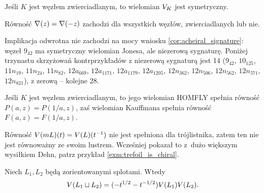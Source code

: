 \begin{corollary}
%
\label{cor:jones_of_amphicheiral}%
    Jeśli $K$ jest węzłem zwierciadlanym, to wielomian $V_K$ jest symetryczny.
\end{corollary}

Równość $\nabla(z) = \nabla(-z)$ zachodzi dla wszystkich węzłów, zwierciadlanych lub nie.

Implikacja odwrotna nie zachodzi na mocy wniosku \ref{cor:acheiral_signature}: węzeł $9_{42}$ ma symetryczny wielomian Jonesa, ale niezerową sygnaturę.
%
Poniżej trzynastu skrzyżowań kontrprzykładów z niezerową sygnaturą jest 14 ($9_{42}$, $10_{125}$, $11n_{19}$, $11n_{24}$, $11n_{82}$, $12a_{669}$, $12a_{1171}$, $12a_{1179}$, $12a_{1205}$, $12n_{362}$, $12n_{506}$, $12n_{562}$, $12n_{571}$, $12n_{821}$), z zerową -- kolejne 28.

\begin{corollary}
%
    Jeśli $K$ jest węzłem zwierciadlanym, to jego wielomian HOMFLY spełnia równość $P(a, z) = P(1/a, z)$, zaś wielomian Kauffmana spełnia równość $F(a, z) = F(1/a, z)$.
\end{corollary}

Równość $V(mL)(t) = V(L)(t^{-1})$ nie jest spełniona dla trójlistnika, zatem ten nie jest równoważny ze swoim lustrem.
Wcześniej pokazał to z~dużo większym wysiłkiem Dehn, patrz przykład \ref{exm:trefoil_is_chiral}.
%

\begin{proposition}
%
\label{prp:jones_multiplicative_1}%
    Niech $L_1, L_2$ będą zorientowanymi splotami.
    Wtedy
    \begin{equation}
        V(L_1 \sqcup L_2) = (-t^{1/2} - t^{-1/2}) V(L_1) V(L_2).
    \end{equation}
\end{proposition}

